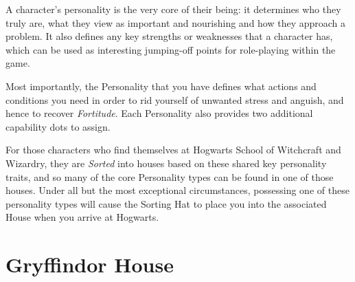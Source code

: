 \newcommand\gapText[1]
{
	~~~~~\parbox[t]{5.8 cm}{\raggedright #1}
}

\newcommand\persEntry[2]
{
	{\bf #1} & \gapText{#2} \\
}
\newcommand\personality[6]
{
	\vbox
	{
	\subsubsection{\key{ #1}}
	\index{Personalities!#1}
	#2
	\renewcommand{\arraystretch}{2}
	\begin{tabular}{r l }
	
	\persEntry{Bonuses}{#3}
	
	\persEntry{Assets \& Flaws}{You draw strength from #4, though your #5 often leads you into trouble. }
	
	\index{Fortitude!Regeneration}
	\persEntry{Nourishment}{You regain Fortitude whenever you #6.}
	\end{tabular}
	}
}

\label{C:Personality}

A character's personality is the very core of their being: it determines who they truly are, what they view as important and nourishing and how they approach a problem. It also defines any key strengths or weaknesses that a character has, which can be used as interesting jumping-off points for role-playing within the game. 

Most importantly, the Personality that you have defines what actions and conditions you need in order to rid yourself of unwanted stress and anguish, and hence to recover {\it Fortitude}. Each Personality also provides two additional capability dots to assign. 

For those characters who find themselves at Hogwarts School of Witchcraft and Wizardry, they are {\it Sorted} into houses based on these shared key personality traits, and so many of the core Personality types can be found in one of those houses. Under all but the most exceptional circumstances, possessing one of these personality types will cause the Sorting Hat to place you into the associated House when you arrive at Hogwarts. 

\section{Gryffindor House}


